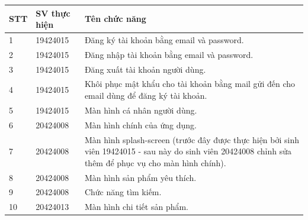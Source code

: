 \documentclass[12pt]{article}
\begin{document}
\begin{tabular}{ |p{1cm}||p{3cm}|p{12cm}| }
    \hline
    \textbf{STT} & \textbf{SV thực hiện} & \textbf{Tên chức năng}                                                                                                                                 \\
    \hline \hline
    1            & 19424015              & Đăng ký tài khoản bằng email và password.                                                                                                              \\ \hline
    2            & 19424015              & Đăng nhập tài khoản bằng email và password.                                                                                                            \\ \hline
    3            & 19424015              & Đăng xuất tài khoản người dùng.                                                                                                                        \\ \hline
    4            & 19424015              & Khôi phục mật khẩu cho tài khoản bằng mail gửi đến cho email dùng để đăng ký tài khoản.                                                                \\ \hline
    5            & 19424015              & Màn hình cá nhân người dùng.                                                                                                                           \\ \hline
    6            & 20424008              & Màn hình chính của ứng dụng.                                                                                                                           \\ \hline
    7            & 20424008              & Màn hình splash-screen (trước đây được thực hiện bởi sinh viên 19424015 - sau này do sinh viên 20424008 chỉnh sửa thêm để phục vụ cho màn hình chính). \\ \hline
    8            & 20424008              & Màn hình sản phẩm yêu thích.                                                                                                                           \\ \hline
    9            & 20424008              & Chức năng tìm kiếm.                                                                                                                                    \\ \hline
    10           & 20424013              & Màn hình chi tiết sản phẩm.                                                                                                                            \\ \hline

\end{tabular}
\end{document}
